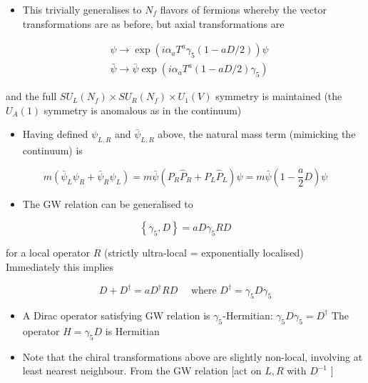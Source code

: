 \begin{itemize}
  \item This trivially generalises to \(N_{f}\) flavors of fermions whereby the vector transformations are as before, but axial transformations are
\end{itemize}

\begin{equation}
\begin{aligned}
& \psi \rightarrow \exp \left(i \alpha_{a} T^{a} \gamma_{5}(1-a D / 2)\right) \psi \\
& \bar{\psi} \rightarrow \bar{\psi} \exp \left(i \alpha_{a} T^{a}(1-a D / 2) \gamma_{5}\right)
\end{aligned}
\end{equation}

and the full \(S U_{L}\left(N_{f}\right) \times S U_{R}\left(N_{f}\right) \times U_{1}(V)\) symmetry is maintained (the \(U_{A}(1)\) symmetry is anomalous as in the continuum)

\begin{itemize}
  \item Having defined \(\psi_{L, R}\) and \(\bar{\psi}_{L, R}\) above, the natural mass term (mimicking the continuum) is
\end{itemize}

\begin{equation}
m\left(\bar{\psi}_{L} \psi_{R}+\bar{\psi}_{R} \psi_{L}\right)=m \bar{\psi}\left(P_{R} \hat{P}_{R}+P_{L} \hat{P}_{L}\right) \psi=m \bar{\psi}\left(1-\frac{a}{2} D\right) \psi
\end{equation}

\begin{itemize}
  \item The GW relation can be generalised to
\end{itemize}

\begin{equation}
\left\{\gamma_{5}, D\right\}=a D {\gamma_5} R D
\end{equation}

for a local operator \(R\) (strictly ultra-local = exponentially localised)\\
Immediately this implies

\begin{equation}
D+D^{\dagger}=a D^{\dagger} R D \quad \text { where } D^{\dagger}=\gamma_{5} D \gamma_5
\end{equation}

\begin{itemize}
  \item A Dirac operator satisfying GW relation is \(\gamma_{5}\)-Hermitian: \(\gamma_{5} D \gamma_{5}=D^{\dagger}\) The operator \(H=\gamma_5 D\) is Hermitian
  \item Note that the chiral transformations above are slightly non-local, involving at least nearest neighbour. From the GW relation [act on \(L, R\) with \(D^{-1}\) ]
\end{itemize}

